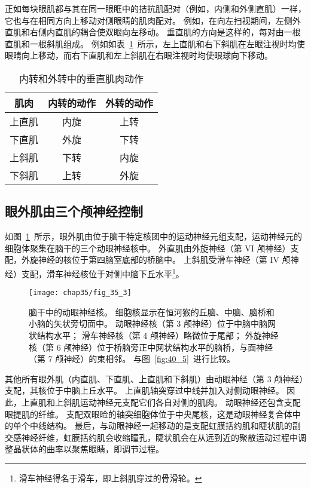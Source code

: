 正如每块眼肌都与其在同一眼眶中的拮抗肌配对（例如，内侧和外侧直肌）一样，它也与在相同方向上移动对侧眼睛的肌肉配对。
例如，在向左扫视期间，左侧外直肌和右侧内直肌的耦合使双眼向左移动。
垂直肌的方向是这样的，每对由一根直肌和一根斜肌组成。
例如如表~\ref{tab:35_1}~所示，左上直肌和右下斜肌在左眼注视时均使眼睛向上移动，而右下直肌和左上斜肌在右眼注视时均使眼球向下移动。


\begin{table}[htbp]
	\caption{内转和外转中的垂直肌肉动作\label{tab:35_1}}
	\centering
	\begin{tabular}{ccc}
		\toprule
		肌肉 & 内转的动作 
		& 外转的动作 \\
		\midrule
		上直肌 & 内旋  & 上转 \\
		下直肌      & 外旋 	& 下转 \\
		上斜肌      & 下转 	& 内旋 \\
		下斜肌      & 上转 	& 外旋 \\
		\bottomrule
	\end{tabular}
\end{table}



\subsection{眼外肌由三个颅神经控制}

如图~\ref{fig:35_3}~所示，眼外肌由位于脑干特定核团中的运动神经元组支配，运动神经元的细胞体聚集在脑干的三个动眼神经核中。
外直肌由外旋神经（第 VI 颅神经）支配，外旋神经的核位于第四脑室底部的桥脑中。
上斜肌受滑车神经（第 IV 颅神经）支配，滑车神经核位于对侧中脑下丘水平\footnote{滑车神经得名于滑车，即上斜肌穿过的骨滑轮。}。


\begin{figure}[htbp]
	\centering
	\texttt{[image: chap35/fig\_35\_3]}
	\caption{脑干中的动眼神经核。
		细胞核显示在恒河猴的丘脑、中脑、脑桥和小脑的矢状旁切面中。
		动眼神经核（第 3 颅神经）位于中脑中脑网状结构水平；
		滑车神经核（第 4 颅神经）略微位于尾部；
		外旋神经核（第 6 颅神经）位于桥脑旁正中网状结构水平的脑桥，与面神经（第 7 颅神经）的束相邻\cite{henn1982primate}。 
		与图~\ref{fig:40_5}~进行比较。}
	\label{fig:35_3}
\end{figure}


其他所有眼外肌（内直肌、下直肌、上直肌和下斜肌）由动眼神经（第 3 颅神经）支配，其核位于中脑上丘水平。
上直肌轴突穿过中线并加入对侧动眼神经。
因此，上直肌和上斜肌运动神经元支配它们各自对侧的肌肉。
动眼神经还包含支配眼提肌的纤维。
支配双眼睑的轴突细胞体位于中央尾核，这是动眼神经复合体中的单个中线结构。
最后，与动眼神经一起移动的是支配虹膜括约肌和睫状肌的副交感神经纤维，虹膜括约肌会收缩瞳孔，睫状肌会在从远到近的聚散运动过程中调整晶状体的曲率以聚焦眼睛，即调节过程。



